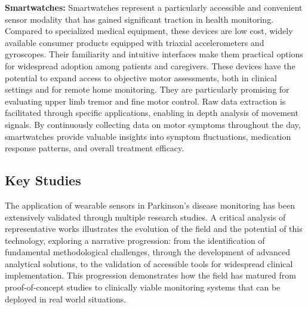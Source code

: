 \documentclass[sigconf,nonacm]{acmart}
\begin{document}
    \textbf{Smartwatches:} Smartwatches represent a particularly accessible and convenient sensor modality that has gained significant traction in health monitoring. Compared to specialized medical equipment, these devices are low cost, widely available consumer products equipped with triaxial accelerometers and gyroscopes. Their familiarity and intuitive interfaces make them practical options for widespread adoption among patients and caregivers. These devices have the potential to expand access to objective motor assessments, both in clinical settings and for remote home monitoring. They are particularly promising for evaluating upper limb tremor and fine motor control. Raw data extraction is facilitated through specific applications, enabling in depth analysis of movement signals. By continuously collecting data on motor symptoms throughout the day, smartwatches provide valuable insights into symptom fluctuations, medication response patterns, and overall treatment efficacy.

\subsection{Key Studies}

    The application of wearable sensors in Parkinson's disease monitoring has been extensively validated through multiple research studies. A critical analysis of representative works illustrates the evolution of the field and the potential of this technology, exploring a narrative progression: from the identification of fundamental methodological challenges, through the development of advanced analytical solutions, to the validation of accessible tools for widespread clinical implementation. This progression demonstrates how the field has matured from proof-of-concept studies to clinically viable monitoring systems that can be deployed in real world situations.
\end{document}
